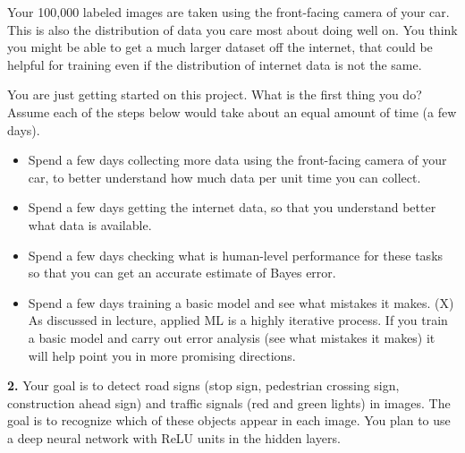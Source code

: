 Your 100,000 labeled images are taken using the front-facing camera of your car. This is also the distribution of data you care most about doing well on. You think you might be able to get a much larger dataset off the internet, that could be helpful for training even if the distribution of internet data is not the same.

You are just getting started on this project. What is the first thing you do? Assume each of the steps below would take about an equal amount of time (a few days).
\begin{itemize}
    \item Spend a few days collecting more data using the front-facing camera of your car, to better understand how much data per unit time you can collect.
    \item Spend a few days getting the internet data, so that you understand better what data is available.
    \item Spend a few days checking what is human-level performance for these tasks so that you can get an accurate estimate of Bayes error.
    \item Spend a few days training a basic model and see what mistakes it makes. (X) As discussed in lecture, applied ML is a highly iterative process. If you train a basic model and carry out error analysis (see what mistakes it makes) it will help point you in more promising directions.
\end{itemize}
\textbf{2.} Your goal is to detect road signs (stop sign, pedestrian crossing sign, construction ahead sign) and traffic signals (red and green lights) in images. The goal is to recognize which of these objects appear in each image. You plan to use a deep neural network with ReLU units in the hidden layers.

